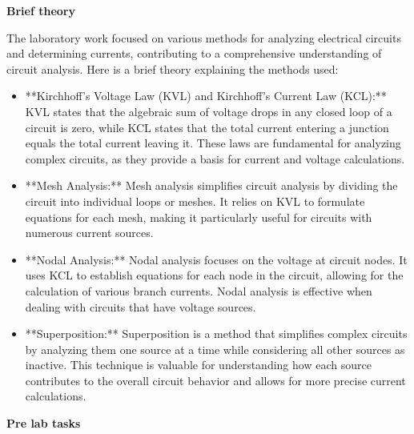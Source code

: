 \documentclass{article}
\begin{document}
\begin{flushleft}
\textbf{Brief theory}
\end{flushleft}

\begin{flushleft}
The laboratory work focused on various methods for analyzing electrical circuits and determining currents, contributing to a comprehensive understanding of circuit analysis. Here is a brief theory explaining the methods used:

\begin{itemize}
    \item **Kirchhoff's Voltage Law (KVL) and Kirchhoff's Current Law (KCL):** KVL states that the algebraic sum of voltage drops in any closed loop of a circuit is zero, while KCL states that the total current entering a junction equals the total current leaving it. These laws are fundamental for analyzing complex circuits, as they provide a basis for current and voltage calculations.

    \item **Mesh Analysis:** Mesh analysis simplifies circuit analysis by dividing the circuit into individual loops or meshes. It relies on KVL to formulate equations for each mesh, making it particularly useful for circuits with numerous current sources.

    \item **Nodal Analysis:** Nodal analysis focuses on the voltage at circuit nodes. It uses KCL to establish equations for each node in the circuit, allowing for the calculation of various branch currents. Nodal analysis is effective when dealing with circuits that have voltage sources.

    \item **Superposition:** Superposition is a method that simplifies complex circuits by analyzing them one source at a time while considering all other sources as inactive. This technique is valuable for understanding how each source contributes to the overall circuit behavior and allows for more precise current calculations.
\end{itemize}
\end{flushleft}

\begin{flushleft}
\textbf{Pre lab tasks}
\end{flushleft}


\end{document}
